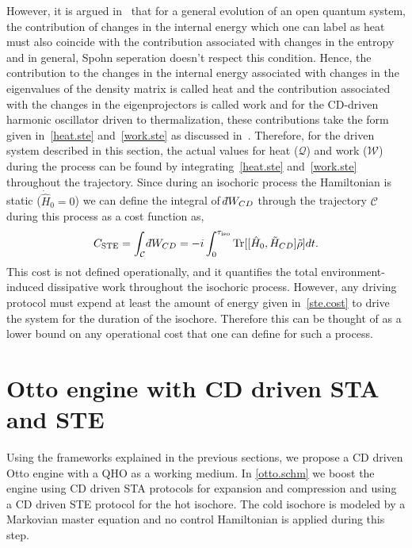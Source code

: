 \documentclass[aps,pra,twocolumn,showpacs,showkeys,groupedaddress,nobalancelastpage,nofootinbib,floatfix,superscriptaddress,longbibliography]{revtex4-2}
\begin{document}
However, it is argued in~\cite{PhysRevA.105.L040201} that for a general evolution of an open quantum system, the contribution of changes in the internal energy which one can label as heat must also coincide with the contribution associated with changes in the entropy and in general, Spohn seperation doesn't respect this condition. Hence, the contribution to the changes in the internal energy associated with changes in the eigenvalues of the density matrix is called heat and the contribution associated with the changes in the eigenprojectors is called work and for the CD-driven harmonic oscillator driven to thermalization, these contributions take the form given in~\cref{heat.ste} and~\cref{work.ste} as discussed in~\cite{PhysRevA.105.L040201}. Therefore, for the driven system described in this section, the actual values for heat ($\mathcal{Q}$) and work ($\mathcal{W}$) during the process can be found by integrating~\cref{heat.ste} and~\cref{work.ste} throughout the trajectory. Since during an isochoric process the Hamiltonian is static ($\dot{\hat{H}}_0=0$) we can define the integral of $\dbar W_{CD}$ through the trajectory $\mathcal{C}$ during this process as a cost function as,
\begin{equation}\label{ste.cost}
C_{\text{STE}} = \int_{\mathcal{C}} \dbar W_{CD} = -i\int_{0}^{\tau_{\text{iso}}} \text{Tr}[[\hat{H}_0,\tilde{H}_{CD}] \tilde{\rho}]dt.
\end{equation}
This cost is not defined operationally, and it quantifies the total environment-induced dissipative work throughout the isochoric process. However, any driving protocol must expend at least the amount of energy given in~\cref{ste.cost} to drive the system for the duration of the isochore. Therefore this can be thought of as a lower bound on any operational cost that one can define for such a process.

\section{Otto engine with CD driven STA and STE}
\label{sec:otto_sta_ste}
Using the frameworks explained in the previous sections, we propose a CD driven Otto engine with a QHO as a working medium. In \cref{otto.schm} we boost the engine using CD driven STA protocols for expansion and compression and using a CD driven STE protocol for the hot isochore. The cold isochore is modeled by a Markovian master equation and no control Hamiltonian is applied during this step.\\
\end{document}
